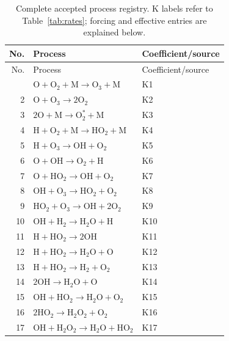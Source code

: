 \begin{longtable}{rp{}p{}}\caption{Complete accepted process registry. K labels refer to Table~\ref{tab:rates}; forcing and effective entries are explained below.}\label{tab:network}\\\toprule No. & Process & Coefficient/source\\\midrule\endfirsthead\toprule No. & Process & Coefficient/source\\\midrule\endhead\bottomrule\endfoot
1 & $\mathrm{O}+\mathrm{O_{2}}+\mathrm{M}\longrightarrow \mathrm{O_{3}}+\mathrm{M}$ & K1\\
2 & $\mathrm{O}+\mathrm{O_{3}}\longrightarrow 2\mathrm{O_{2}}$ & K2\\
3 & $2\mathrm{O}+\mathrm{M}\longrightarrow \mathrm{O}_2^*+\mathrm{M}$ & K3\\
4 & $\mathrm{H}+\mathrm{O_{2}}+\mathrm{M}\longrightarrow \mathrm{HO_{2}}+\mathrm{M}$ & K4\\
5 & $\mathrm{H}+\mathrm{O_{3}}\longrightarrow \mathrm{OH}+\mathrm{O_{2}}$ & K5\\
6 & $\mathrm{O}+\mathrm{OH}\longrightarrow \mathrm{O_{2}}+\mathrm{H}$ & K6\\
7 & $\mathrm{O}+\mathrm{HO_{2}}\longrightarrow \mathrm{OH}+\mathrm{O_{2}}$ & K7\\
8 & $\mathrm{OH}+\mathrm{O_{3}}\longrightarrow \mathrm{HO_{2}}+\mathrm{O_{2}}$ & K8\\
9 & $\mathrm{HO_{2}}+\mathrm{O_{3}}\longrightarrow \mathrm{OH}+2\mathrm{O_{2}}$ & K9\\
10 & $\mathrm{OH}+\mathrm{H_{2}}\longrightarrow \mathrm{H_{2}O}+\mathrm{H}$ & K10\\
11 & $\mathrm{H}+\mathrm{HO_{2}}\longrightarrow 2\mathrm{OH}$ & K11\\
12 & $\mathrm{H}+\mathrm{HO_{2}}\longrightarrow \mathrm{H_{2}O}+\mathrm{O}$ & K12\\
13 & $\mathrm{H}+\mathrm{HO_{2}}\longrightarrow \mathrm{H_{2}}+\mathrm{O_{2}}$ & K13\\
14 & $2\mathrm{OH}\longrightarrow \mathrm{H_{2}O}+\mathrm{O}$ & K14\\
15 & $\mathrm{OH}+\mathrm{HO_{2}}\longrightarrow \mathrm{H_{2}O}+\mathrm{O_{2}}$ & K15\\
16 & $2\mathrm{HO_{2}}\longrightarrow \mathrm{H_{2}O_{2}}+\mathrm{O_{2}}$ & K16\\
17 & $\mathrm{OH}+\mathrm{H_{2}O_{2}}\longrightarrow \mathrm{H_{2}O}+\mathrm{HO_{2}}$ & K17\\

\end{longtable}
